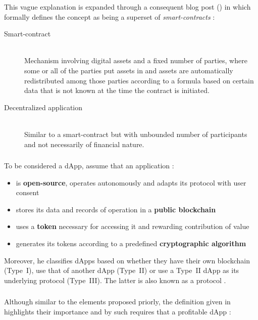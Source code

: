 This vague explanation is expanded through a consequent blog post (\citeyear{Buterin2014}) in which \citeauthor{Buterin2014} formally defines the concept as being a superset of \textit{smart-contracts} \cite{Buterin2014}:

\begin{description}
	\item[Smart-contract]
	\hfill \\
	Mechanism involving digital assets and a fixed number of parties, where some or all of the parties put assets in and assets are automatically redistributed among those parties according to a formula based on certain data that is not known at the time the contract is initiated.
	\item[Decentralized application]
	\hfill \\
	Similar to a smart-contract but with unbounded number of participants and not necessarily of financial nature.
\end{description}

\subsubsection{\citeyear{Johnston2015}}
To be considered a \ac{dApp}, \citeauthor{Johnston2015} assume that an application \cite[p.~2]{Johnston2015}:

\begin{itemize}
  \item is \textbf{open-source}, operates autonomously and adapts its protocol with user consent 
  \item stores its data and records of operation in a \textbf{public blockchain}
  \item uses a \textbf{token} necessary for accessing it and rewarding contribution of value
  \item generates its tokens according to a predefined \textbf{cryptographic algorithm}
\end{itemize}

Moreover, he classifies \acp{dApp} based on whether they have their own blockchain (Type~I), use that of another \ac{dApp} (Type~II) or use a Type~II \ac{dApp} as its underlying protocol (Type~III). The latter is also known as a protocol \cite[pp.~3-4]{Johnston2015}.

\subsubsection{\citeyear{Raval.2016}}
Although similar to the elements proposed priorly, the definition given in  highlights their importance and by such requires that a profitable \ac{dApp} \cite[pp.~9-14]{Raval.2016}:
 
